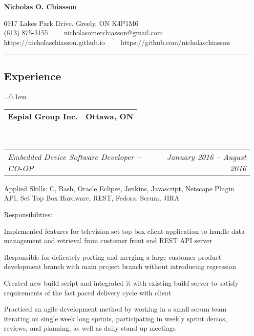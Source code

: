 \documentclass[10pt,letterpaper]{article}
\makeatletter
\newenvironment{indentsection}[1]%
{\begin{list}{}%
  {\setlength{\leftmargin}{#1}}%
  \item[]%
}
{\end{list}}
\newcommand{\headerrow}[2]
{\begin{tabular*}{\linewidth}{l@{\extracolsep{\fill}}r}
  #1 &
  #2 \\
\end{tabular*}}
\newcommand{\formalname}
{Nicholas O. Chiasson}
\makeatother
\begin{document}
\begin{center}
{\LARGE \textbf{\formalname}}

6917 Lakes Park Drive, Greely, ON K4P1M6
\\
(613) 875-3155\ \ \textbullet
\ \ nicholasomerchiasson@gmail.com
\\
https://nicholaschiasson.github.io\ \ \textbullet
\ \ https://github.com/nicholaschiasson
\end{center}

\hrule
\vspace{-0.4em}
\subsection*{Experience}

\begin{itemize}
  \parskip=0.1em

  \item
  \headerrow
    {\textbf{Espial Group Inc.}}
    {\textbf{Ottawa, ON}}
  \\
  \headerrow
    {\emph{Embedded Device Software Developer -- CO-OP}}
    {\emph{January 2016 -- August 2016}}
  \begin{indentsection}{1em}
    \begin{description*}
      \item[Applied Skills:]
      C, Bash, Oracle Eclipse, Jenkins, Javascript, Netscape Plugin API, Set Top
      Box Hardware, REST, Fedora, Scrum, JIRA
      \item[Responsibilities:]
      \hfill
      \begin{itemize*}
        \item Implemented features for television set top box client application
        to handle data management and retrieval from customer front end REST API
        server
        \item Responsible for delicately porting and merging a large customer
        product development branch with main project branch without introducing
        regression
        \item Created new build script and integrated it with existing build
        server to satisfy requirements of the fast paced delivery cycle with
        client
        \item Practiced an agile development method by working in a small scrum
        team iterating on single week long sprints, participating in weekly sprint
        demos, reviews, and planning, as well as daily stand up meetings
      \end{itemize*}
    \end{description*}
  \end{indentsection}


\end{itemize}
\end{document}
